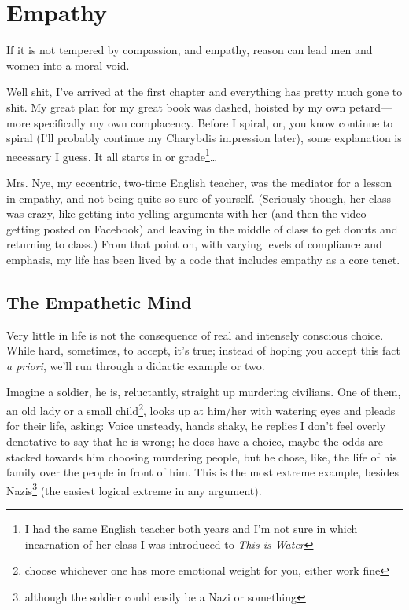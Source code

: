 \documentclass[../butidigress.tex]{subfiles}
\begin{document}
\chapter{Empathy}\label{chap:empathy}
\epigraph{If it is not tempered by compassion, and empathy, reason can lead men and women into a moral void.}{}
\newpage

Well shit, I've arrived at the first chapter and everything has pretty much gone to shit.
My great plan for my great book was dashed, hoisted by my own petard---more specifically my own complacency.
Before I spiral, or, you know continue to spiral (I'll probably continue my Charybdis impression later), some explanation is necessary I guess.
It all starts in  or  grade\footnote{I had the same English teacher both years and I'm not sure in which incarnation of her class I was introduced to \textit{This is Water}}\ldots{}

Mrs. Nye, my eccentric, two-time English teacher, was the mediator for a lesson in empathy, and not being quite so sure of yourself.
(Seriously though, her class was crazy, like getting into yelling arguments with her (and then the video getting posted on Facebook) and leaving in the middle of class to get donuts and returning to class.)
From that point on, with varying levels of compliance and emphasis, my life has been lived by a code that includes empathy as a core tenet.

\section{The Empathetic Mind}
Very little in life is not the consequence of real and intensely conscious choice.
While hard, sometimes, to accept, it's true; instead of hoping you accept this fact \textit{a priori}, we'll run through a didactic example or two.

Imagine a soldier, he is, reluctantly, straight up murdering civilians.
One of them, an old lady or a small child\footnote{choose whichever one has more emotional weight for you, either work fine}, looks up at him/her with watering eyes and pleads for their life, asking: 
Voice unsteady, hands shaky, he replies 
I don't feel overly denotative to say that he is wrong; he does have a choice, maybe the odds are stacked towards him choosing murdering people, but he chose, like, the life of his family over the people in front of him.
This is the most extreme example, besides Nazis\footnote{although the soldier could easily be a Nazi or something} (the easiest logical extreme in any argument).
\end{document}
